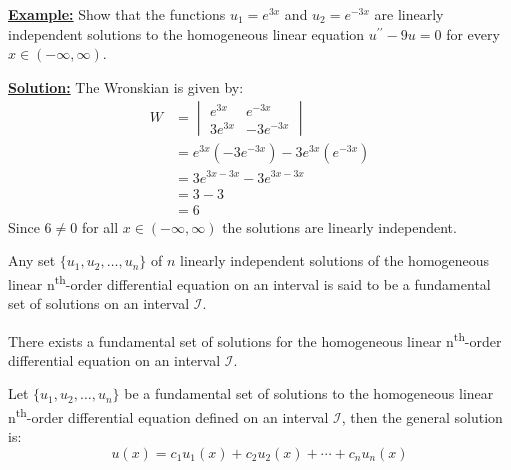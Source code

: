 \vspace{0.5cm}

\noindent\textbf{\underline{Example:}} Show that the functions $u_1 = e^{3x}$ and $u_2=e^{-3x}$ are linearly independent solutions to the homogeneous linear equation $u^{\prime \prime}-9u=0$ for every $x \in (-\infty,\infty)$.

\vspace{4.5cm}

\noindent\textbf{\underline{Solution:}} The Wronskian is given by:
\begin{align*}
W &= 
\begin{vmatrix}
e^{3x} & e^{-3x} \\
3e^{3x} & -3e^{-3x}
\end{vmatrix} \\
&= e^{3x}\left(-3e^{-3x}\right) - 3e^{3x}\left(e^{-3x}\right) \\
&= 3e^{3x-3x} - 3e^{3x-3x} \\
&= 3 - 3 \\
&= 6
\end{align*}
\noindent Since $6 \ne 0$ for all $x \in (-\infty,\infty)$ the solutions are linearly independent.

\begin{definition}
Any set $\{u_1,u_2,\dots,u_n\}$ of $n$ linearly independent solutions of the homogeneous linear n\textsuperscript{th}-order differential equation on an interval is said to be a fundamental set of solutions on an interval $\mathcal{I}$.  
\end{definition}
\begin{theorem}
There exists a fundamental set of solutions for the homogeneous linear n\textsuperscript{th}-order differential equation on an interval $\mathcal{I}$.
\end{theorem}

\begin{definition}
Let $\{u_1,u_2,\dots,u_n\}$ be a fundamental set of solutions to the homogeneous linear n\textsuperscript{th}-order differential equation defined on an interval $\mathcal{I}$, then the general solution is:
$$u(x) = c_1u_1(x)+c_2u_2(x)+\cdots+c_nu_n(x)$$
\end{definition}

